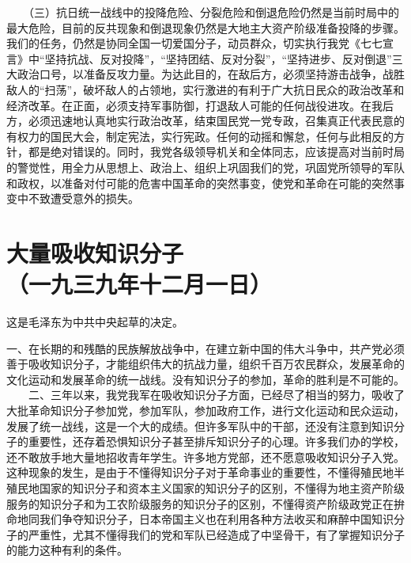 \documentclass[cn,11pt,chinese]{elegantbook}
\def\myformat#1{\hfil\hfil #1}
\begin{document}
　　（三）抗日统一战线中的投降危险、分裂危险和倒退危险仍然是当前时局中的最大危险，目前的反共现象和倒退现象仍然是大地主大资产阶级准备投降的步骤。我们的任务，仍然是协同全国一切爱国分子，动员群众，切实执行我党《七七宣言》中“坚持抗战、反对投降”，“坚持团结、反对分裂”，“坚持进步、反对倒退”三大政治口号，以准备反攻力量。为达此目的，在敌后方，必须坚持游击战争，战胜敌人的“扫荡”，破坏敌人的占领地，实行激进的有利于广大抗日民众的政治改革和经济改革。在正面，必须支持军事防御，打退敌人可能的任何战役进攻。在我后方，必须迅速地认真地实行政治改革，结束国民党一党专政，召集真正代表民意的有权力的国民大会，制定宪法，实行宪政。任何的动摇和懈怠，任何与此相反的方针，都是绝对错误的。同时，我党各级领导机关和全体同志，应该提高对当前时局的警觉性，用全力从思想上、政治上、组织上巩固我们的党，巩固党所领导的军队和政权，以准备对付可能的危害中国革命的突然事变，使党和革命在可能的突然事变中不致遭受意外的损失。\\
\newpage\section*{\myformat{大量吸收知识分子}\\\myformat{（一九三九年十二月一日）}}
\begin{introduction}\item  这是毛泽东为中共中央起草的决定。\end{introduction}
一、在长期的和残酷的民族解放战争中，在建立新中国的伟大斗争中，共产党必须善于吸收知识分子，才能组织伟大的抗战力量，组织千百万农民群众，发展革命的文化运动和发展革命的统一战线。没有知识分子的参加，革命的胜利是不可能的。\\
　　二、三年以来，我党我军在吸收知识分子方面，已经尽了相当的努力，吸收了大批革命知识分子参加党，参加军队，参加政府工作，进行文化运动和民众运动，发展了统一战线，这是一个大的成绩。但许多军队中的干部，还没有注意到知识分子的重要性，还存着恐惧知识分子甚至排斥知识分子的心理。许多我们办的学校，还不敢放手地大量地招收青年学生。许多地方党部，还不愿意吸收知识分子入党。这种现象的发生，是由于不懂得知识分子对于革命事业的重要性，不懂得殖民地半殖民地国家的知识分子和资本主义国家的知识分子的区别，不懂得为地主资产阶级服务的知识分子和为工农阶级服务的知识分子的区别，不懂得资产阶级政党正在拚命地同我们争夺知识分子，日本帝国主义也在利用各种方法收买和麻醉中国知识分子的严重性，尤其不懂得我们的党和军队已经造成了中坚骨干，有了掌握知识分子的能力这种有利的条件。\\
\end{document}
